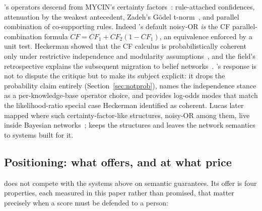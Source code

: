 \pla{}'s operators descend from MYCIN's certainty
factors~\cite{shortliffe1975}: rule-attached confidences, attenuation by
the weakest antecedent, Zadeh's G\"odel t-norm~\cite{zadeh1965}, 
and parallel combination of co-supporting rules. Indeed \pla{}'s default
noisy-OR \emph{is} the CF parallel-combination formula
$\mathit{CF} = \mathit{CF}_1 + \mathit{CF}_2(1-\mathit{CF}_1)$, an
equivalence enforced by a unit test. Heckerman showed that the CF
calculus is probabilistically coherent only under restrictive
independence and modularity assumptions~\cite{heckerman1986}, and the
field's retrospective explains the subsequent migration to belief
networks~\cite{pearl1988,heckerman1992}. \pla{}'s response is not to dispute the
critique but to make its subject explicit: it drops the probability
claim entirely (Section~\ref{sec:notprob}), names the independence
stance as a per-knowledge-base operator choice, and provides log-odds
modes that match the likelihood-ratio special case Heckerman identified
as coherent. Lucas later mapped where such certainty-factor-like
structures, noisy-OR among them, live inside Bayesian
networks~\cite{lucas2001}; \pla{} keeps the structures and leaves the
network semantics to systems built for it.

\subsection{Positioning: what \pla{} offers, and at what price}

\pla{} does not compete with the systems above on semantic guarantees.
Its offer is four properties, each measured in this paper rather
than promised, that matter precisely when a score must be defended
to a person:


